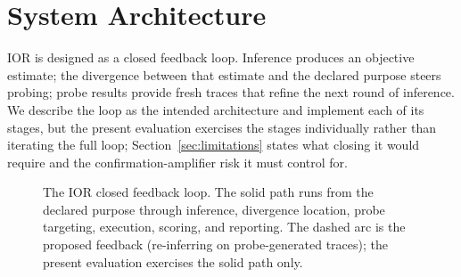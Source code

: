 \section{System Architecture}
\label{sec:architecture}

IOR is designed as a closed feedback loop. Inference produces an objective estimate;
the divergence between that estimate and the declared purpose steers probing; probe
results provide fresh traces that refine the next round of inference. We describe the
loop as the intended architecture and implement each of its stages, but the present
evaluation exercises the stages individually rather than iterating the full loop;
Section~\ref{sec:limitations} states what closing it would require and the
confirmation-amplifier risk it must control for.

\begin{figure}[h]
\centering
{}
\caption{The IOR closed feedback loop. The solid path runs from the declared purpose
through inference, divergence location, probe targeting, execution, scoring, and
reporting. The dashed arc is the proposed feedback (re-inferring on probe-generated
traces); the present evaluation exercises the solid path only.}
\label{fig:loop}
\end{figure}

